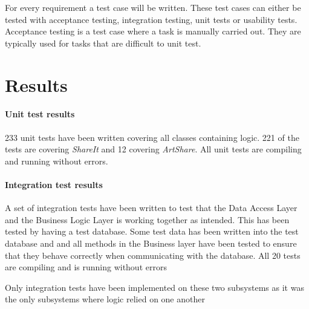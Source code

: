 \documentclass[../report.tex]{subfiles}
\begin{document}
For every requirement a test case will be written. These test cases can either be tested with acceptance testing, integration testing, unit tests or usability tests. Acceptance testing is a test case where a task is manually carried out. They are typically used for tasks that are difficult to unit test. 

\section{Results}

\paragraph{Unit test results}

233 unit tests have been written covering all classes containing logic. 221 of the tests are covering \textit{ShareIt} and 12 covering \textit{ArtShare}. All unit tests are compiling and running without errors.

\paragraph{Integration test results}

A set of integration tests have been written to test that the Data Access Layer and the Business Logic Layer is working together as intended. This has been tested by having a test database. Some test data has been written into the test database and and all methods in the Business layer have been tested to ensure that they behave correctly when communicating with the database. All 20 tests are compiling and is running without errors

Only integration tests have been implemented on these two subsystems as it was the only subsystems where logic relied on one another
\end{document}
